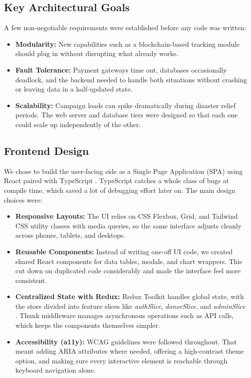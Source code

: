 \documentclass{thesis-library}
\begin{document}
\subsection{Key Architectural Goals}
A few non-negotiable requirements were established before any code was written:
\begin{itemize}
    \item \textbf{Modularity:} New capabilities such as a blockchain-based tracking module should plug in without disrupting what already works.
    \item \textbf{Fault Tolerance:} Payment gateways time out, databases occasionally deadlock, and the backend needed to handle both situations without crashing or leaving data in a half-updated state.
    \item \textbf{Scalability:} Campaign loads can spike dramatically during disaster relief periods. The web server and database tiers were designed so that each one could scale up independently of the other.
\end{itemize}

\subsection{Frontend Design}
We chose to build the user-facing side as a Single Page Application (SPA) using React paired with TypeScript \cite{cherny2019programming}. TypeScript catches a whole class of bugs at compile time, which saved a lot of debugging effort later on. The main design choices were:
\begin{itemize}
    \item \textbf{Responsive Layouts:} The UI relies on CSS Flexbox, Grid, and Tailwind CSS utility classes with media queries, so the same interface adjusts cleanly across phones, tablets, and desktops.
    \item \textbf{Reusable Components:} Instead of writing one-off UI code, we created shared React components for data tables, modals, and chart wrappers. This cut down on duplicated code considerably and made the interface feel more consistent.
    \item \textbf{Centralized State with Redux:} Redux Toolkit handles global state, with the store divided into feature slices like \textit{authSlice}, \textit{donorSlice}, and \textit{adminSlice} \cite{banks2017learning}. Thunk middleware manages asynchronous operations such as API calls, which keeps the components themselves simpler.
    \item \textbf{Accessibility (a11y):} WCAG guidelines were followed throughout. That meant adding ARIA attributes where needed, offering a high-contrast theme option, and making sure every interactive element is reachable through keyboard navigation alone.
\end{itemize}
\end{document}

